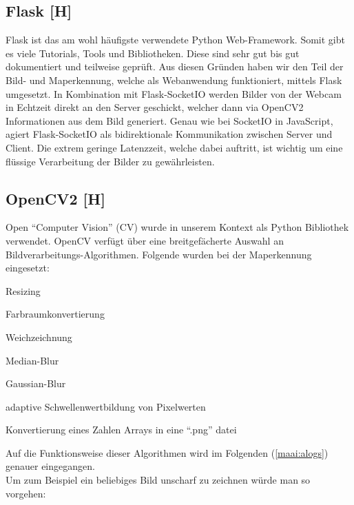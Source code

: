 \subsection{Flask [H]}
Flask ist das am wohl häufigste verwendete Python Web-Framework. Somit gibt es viele Tutorials,
Tools und Bibliotheken. Diese sind sehr gut bis gut dokumentiert und teilweise geprüft.
Aus diesen Gründen haben wir den Teil der Bild- und Maperkennung, welche
als Webanwendung funktioniert, mittels Flask umgesetzt. In Kombination mit Flask-SocketIO werden Bilder von der Webcam
in Echtzeit direkt an den Server geschickt, welcher dann via OpenCV2 Informationen aus dem Bild
generiert. Genau wie bei SocketIO in JavaScript, agiert Flask-SocketIO als bidirektionale
Kommunikation zwischen Server und Client. Die extrem geringe Latenzzeit, welche dabei auftritt,
ist wichtig um eine flüssige Verarbeitung der Bilder zu gewährleisten.

\subsection{OpenCV2 [H]}
Open ``Computer Vision'' (CV) wurde in unserem Kontext als Python Bibliothek verwendet. OpenCV verfügt über eine
breitgefächerte Auswahl an Bildverarbeitungs-Algorithmen.
Folgende wurden bei der Maperkennung eingesetzt:
\begin{compactitem}
    \item Resizing
    \item Farbraumkonvertierung
    \item Weichzeichnung
    \begin{compactitem}
        \item Median-Blur
        \item Gaussian-Blur
    \end{compactitem}
    \item adaptive Schwellenwertbildung von Pixelwerten
    \item Konvertierung eines Zahlen Arrays in eine ``.png'' datei
\end{compactitem}
Auf die Funktionsweise dieser Algorithmen wird im Folgenden (\ref{maai:alogs}) genauer eingegangen.
\\
Um zum Beispiel ein beliebiges Bild unscharf zu zeichnen würde man so vorgehen:
\\

